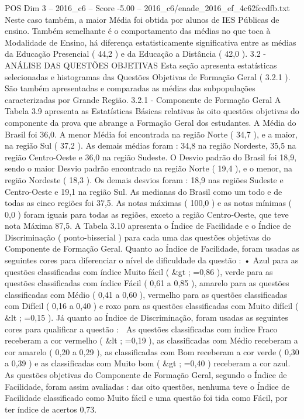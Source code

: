 \begin{textsample}{POS Dim 3 – 2016\_c6 – Score -5.00 – 2016\_c6/enade\_2016\_ef\_4c62fccdfb.txt}
Neste caso também, a maior Média foi obtida por alunos de IES Públicas de ensino.
Também semelhante é o comportamento das médias no que toca à Modalidade de Ensino, há diferença estatisticamente significativa entre as médias da Educação Presencial ( 44,2 ) e da Educação a Distância ( 42,0 ). 3.2 - ANÁLISE DAS QUESTÕES OBJETIVAS Esta seção apresenta estatísticas selecionadas e histogramas das Questões Objetivas de Formação Geral ( 3.2.1 ).
São também apresentadas e comparadas as médias das subpopulações caracterizadas por Grande Região. 3.2.1 - Componente de Formação Geral A Tabela 3.9 apresenta as Estatísticas Básicas relativas às oito questões objetivas do componente da prova que abrange a Formação Geral dos estudantes.
A Média do Brasil foi 36,0.
A menor Média foi encontrada na região Norte ( 34,7 ), e a maior, na região Sul ( 37,2 ).
As demais médias foram : 34,8 na região Nordeste, 35,5 na região Centro-Oeste e 36,0 na região Sudeste.
O Desvio padrão do Brasil foi 18,9, sendo o maior Desvio padrão encontrado na região Norte ( 19,4 ), e o menor, na região Nordeste ( 18,3 ).
Os demais desvios foram : 18,9 nas regiões Sudeste e Centro-Oeste e 19,1 na região Sul.
As medianas do Brasil como um todo e de todas as cinco regiões foi 37,5.
As notas máximas ( 100,0 ) e as notas mínimas ( 0,0 ) foram iguais para todas as regiões, exceto a região Centro-Oeste, que teve nota Máxima 87,5.
A Tabela 3.10 apresenta o Índice de Facilidade e o Índice de Discriminação ( ponto-bisserial ) para cada uma das questões objetivas do Componente de Formação Geral.
Quanto ao Índice de Facilidade, foram usadas as seguintes cores para diferenciar o nível de dificuldade da questão : • Azul para as questões classificadas com índice Muito fácil ( \&gt ; =0,86 ), verde para as questões classificadas com índice Fácil ( 0,61 a 0,85 ), amarelo para as questões classificadas com Médio ( 0,41 a 0,60 ), vermelho para as questões classificadas com Difícil ( 0,16 a 0,40 ) e roxo para as questões classificadas com Muito difícil ( \&lt ; =0,15 ).
Já quanto ao Índice de Discriminação, foram usadas as seguintes cores para qualificar a questão :  As questões classificadas com índice Fraco receberam a cor vermelho ( \&lt ; =0,19 ), as classificadas com Médio receberam a cor amarelo ( 0,20 a 0,29 ), as classificadas com Bom receberam a cor verde ( 0,30 a 0,39 ) e as classificadas com Muito bom ( \&gt ; =0,40 ) receberam a cor azul.
As questões objetivas do Componente de Formação Geral, segundo o Índice de Facilidade, foram assim avaliadas : das oito questões, nenhuma teve o Índice de Facilidade classificado como Muito fácil e uma questão foi tida como Fácil, por ter índice de acertos 0,73.

\end{textsample}
